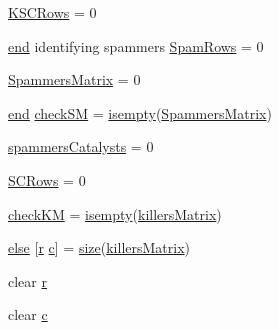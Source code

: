 \begin{DoxyCompactItemize}
\item 
\hyperlink{a00023_a56aa0b3ac00410dc36f9043c641ae205}{K\-S\-C\-Rows} = 0
\item 
\hyperlink{a00019_afb358f48b1646c750fb9da6c6585be2b}{end} identifying spammers \hyperlink{a00023_a834631ce660b52d721b1dd57b60d5251}{Spam\-Rows} = 0
\item 
\hyperlink{a00023_af1801174c9397e7fad0394203f120c31}{Spammers\-Matrix} = 0
\item 
\hyperlink{a00019_afb358f48b1646c750fb9da6c6585be2b}{end} \hyperlink{a00023_ae80cf4c5bf659247b45bbad5d22dec52}{check\-S\-M} = \hyperlink{a00019_ac10445404f4b83302522defb59e25ef7}{isempty}(\hyperlink{a00024_a5bca8ffaecd726e70d088f2e00c9b4e0}{Spammers\-Matrix})
\item 
\hyperlink{a00023_aac2cfcb79655911b15197407f3e8c51c}{spammers\-Catalysts} = 0
\item 
\hyperlink{a00023_a4c9731061d3ea74c9ad35793b15491ab}{S\-C\-Rows} = 0
\item 
\hyperlink{a00023_ac9c871eaf7455dc0d274ec20c5c69ac2}{check\-K\-M} = \hyperlink{a00019_ac10445404f4b83302522defb59e25ef7}{isempty}(\hyperlink{a00024_ab372fd9c8bb38cf3c78e995c0698b0ca}{killers\-Matrix})
\item 
\hyperlink{a00023_af5946383720aa572eb93e1e63afc23c2}{else} \mbox{[}\hyperlink{a00025_ac862e7284527eb913b1351c8bfb8e079}{r} \hyperlink{a00029_a6be92348ba85ef257b11d06209e1d7b6}{c}\mbox{]} = \hyperlink{a00056_ae113ea7f9e515a12ac4b5595c6faf61e}{size}(\hyperlink{a00024_ab372fd9c8bb38cf3c78e995c0698b0ca}{killers\-Matrix})
\item 
clear \hyperlink{a00023_ac862e7284527eb913b1351c8bfb8e079}{r}
\item 
clear \hyperlink{a00023_a8e54ca14679a1ce9245a3b7d55d95570}{c}
\end{DoxyCompactItemize}


